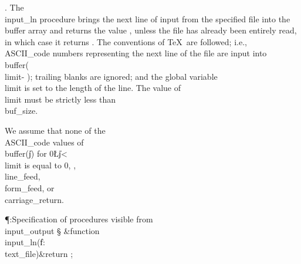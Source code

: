 . The \\{input\_ln} procedure brings the next line of input from the
specified
file into the \\{buffer} array and returns the value , unless the file
has already been entirely read, in which case it returns . The
conventions of \TeX\ are followed; i.e., \\{ASCII\_code} numbers representing
the next line of the file are input into \\{buffer}\?(\?\to\?\\{limit}\?-%
\?)\?;
trailing blanks are ignored;
and the global variable \\{limit} is set to the length of the
line. The value of \\{limit} must be strictly less than \\{buf\_size}.

We assume that none of the \\{ASCII\_code} values
of \\{buffer}\?(\?\|j\?)\? for 0\?\L\?\|j\?<\?\\{limit} is equal to 0, %
, \\{line\_feed},
\\{form\_feed}, or \\{carriage\_return}.

\Y\P\?\4:Specification of procedures visible from \\{input\_output}\X%
\mathrel{+}\S\?\6
\&{function}\8\1\\{input\_ln}\?(\1\?\|f\?:\?\\{text\_file}\?\2)\&{return}\?\8%
\2;\par
\fi

